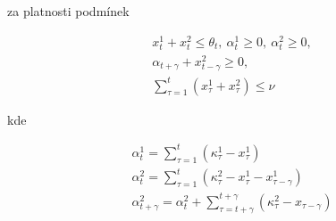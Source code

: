 za platnosti podmínek

\begin{equation}
\begin{aligned}
x_{t}^{1}+x_{t}^{2} \leq \theta_{t}, \: \alpha_{t}^{1} \geq 0, \: \alpha_{t}^{2} \geq 0, \\
\alpha_{t+\gamma} + x_{t-\gamma}^2 \geq 0, \: \\
\sum_{\tau=1}^{t}(x_{\tau}^{1}+x_{\tau}^{2}) \leq \nu
\end{aligned}
\end{equation}

kde

\begin{equation}
\begin{aligned}
\alpha_{t}^{1}=\sum_{\tau=1}^{t}(\kappa_{\tau}^{1}-x_{\tau}^{1}) \\
\alpha_{t}^{2}=\sum_{\tau=1}^{t}(\kappa_{\tau}^{2}-x_{\tau}^{1}-x_{\tau-\gamma}^{1}) \\
\alpha_{t+\gamma}^{2}=\alpha_{t}^{2} + \sum_{\tau=t+\gamma}^{t+\gamma}(\kappa_{\tau}^{2}-x_{\tau-\gamma})
\end{aligned}
\end{equation}





